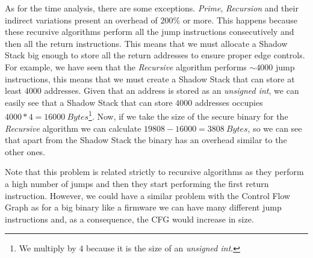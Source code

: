 As for the time analysis, there are some exceptions. \textit{Prime}, \textit{Recursion}
and their indirect variations present an overhead of $200\%$ or more. This
happens because these recursive algorithms perform all the jump instructions
consecutively and then all the return instructions. This means that we must allocate
a Shadow Stack big enough to store all the return addresses to ensure proper edge
controls. For example, we have seen that the \textit{Recursive} algorithm
performs $\sim 4000$ jump instructions, this means that we must create a Shadow Stack
that can store at least $4000$ addresses. Given that an address is stored as an
\textit{unsigned int}, we can easily see that a Shadow Stack that can store
$4000$ addresses occupies $4000*4 = 16000 \ \textit{Bytes}$\footnote{We multiply
by $4$ because it is the size of an \textit{unsigned int}.}. Now, if we take the
size of the secure binary for the \textit{Recursive} algorithm we can calculate
$19808 - 16000 = 380 8 \ \textit{Bytes}$, so we can see that apart from the Shadow
Stack the binary has an overhead similar to the other ones.

Note that this problem is related strictly to recursive algorithms as they perform
a high number of jumps and then they start performing the first return instruction.
However, we could have a similar problem with the Control Flow Graph as for a big
binary like a firmware we can have many different jump instructions and, as a
consequence, the CFG would increase in size.

